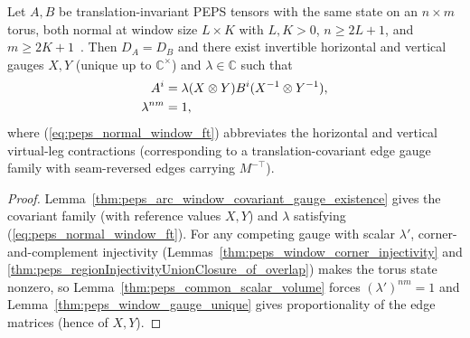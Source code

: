 \begin{lemma}%
    \label{thm:fundamentalTheorem_normalTorusArcWindowPEPS}
    \leanok
    Let $A,B$ be translation-invariant PEPS tensors with the same state on an
    $n\times m$ torus, both normal at window size $L\times K$ with $L,K>0$,
    $n\geq2L+1$, and $m\geq2K+1$~\cite{Molnar2018NormalPEPS}. Then $D_A=D_B$
    and there exist invertible horizontal and vertical gauges $X,Y$ (unique up
    to $\mathbb C^\times$) and $\lambda\in\mathbb C$ such that
    \begin{align}
        A^i          & =\lambda(X\otimes Y)B^i(X^{-1}\otimes Y^{-1}),
        \label{eq:peps_normal_window_ft}                              \\
        \lambda^{nm} & =1,\notag
    \end{align}
    where (\ref{eq:peps_normal_window_ft}) abbreviates the horizontal and
    vertical virtual-leg contractions (corresponding to a translation-covariant
    edge gauge family with seam-reversed edges carrying $M^{-\top}$).
\end{lemma}
\begin{proof}
    \leanok
    Lemma~\ref{thm:peps_arc_window_covariant_gauge_existence} gives the
    covariant family (with reference values $X,Y$) and $\lambda$ satisfying
    (\ref{eq:peps_normal_window_ft}). For any competing gauge with scalar
    $\lambda'$, corner-and-complement injectivity
    (Lemmas~\ref{thm:peps_window_corner_injectivity} and
    \ref{thm:peps_regionInjectivityUnionClosure_of_overlap}) makes the torus
    state nonzero, so Lemma~\ref{thm:peps_common_scalar_volume} forces
    $(\lambda')^{nm}=1$ and Lemma~\ref{thm:peps_window_gauge_unique} gives
    proportionality of the edge matrices (hence of $X,Y$).
\end{proof}
